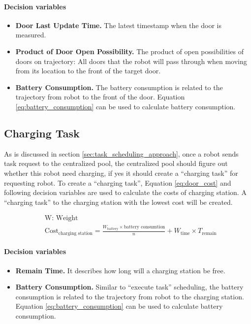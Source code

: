 \paragraph{Decision variables}
\begin{itemize}
	\item \textbf{Door Last Update Time.} The latest timestamp when the door is measured.
	\item \textbf{Product of Door Open Possibility.} The product of open possibilities of doors on trajectory: All doors that the robot will pass through when moving from its location to the front of the target door.
	\item \textbf{Battery Consumption.} The battery consumption is related to the trajectory from robot to the front of the door. Equation \ref{eq:battery_consumption} can be used to calculate battery consumption.
\end{itemize}



\subsection{Charging Task}
As is discussed in section \ref{sec:task_scheduling_approach}, once a robot sends task request to the centralized pool, the centralized pool should figure out whether this robot need charging, if yes it should create a ``charging task'' for requesting robot. 
To create a ``charging task'', Equation \ref{eq:door_cost} and following decision variables are used to calculate the costs of charging station. A ``charging task'' to the charging station with the lowest cost will be created.

\begin{equation}	
\label{eq:charging_station_cost}
\begin{aligned}
	& \mbox{W: Weight } \\
	& \mbox{Cost}_{\mbox{charging station}} = \frac{W_{\mbox{battery}} \times \mbox{battery consumtion}}{n} + W_{\mbox{time}} \times T_{\mbox{remain}}
\end{aligned}
\end{equation}


\paragraph{Decision variables}
\begin{itemize}
	\item \textbf{Remain Time.} It describes how long will a charging station be free. 
	\item \textbf{Battery Consumption.} Similar to ``execute task'' scheduling, the battery consumption is related to the trajectory from robot to the charging station. Equation \ref{eq:battery_consumption} can be used to calculate battery consumption.
\end{itemize}


